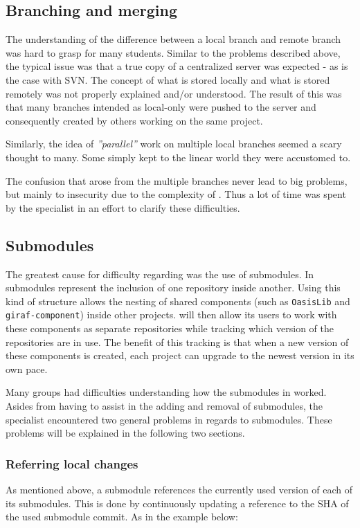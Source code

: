 \subsection{Branching and merging}
The understanding of the difference between a local branch and remote branch was hard to grasp for many students.
Similar to the problems described above, the typical issue was that a true copy of a centralized server was expected - as is the case with SVN.
The concept of what is stored locally and what is stored remotely was not properly explained and/or understood.
The result of this was that many branches intended as local-only were pushed to the server and consequently created by others working on the same project.

Similarly, the idea of \textit{''parallel''} work on multiple local branches seemed a scary thought to many.
Some simply kept to the linear world they were accustomed to.

The confusion that arose from the multiple branches never lead to big problems, but mainly to insecurity due to the complexity of \git{}.
Thus a lot of time was spent by the \git{} specialist in an effort to clarify these difficulties.

\subsection{Submodules}
The greatest cause for difficulty regarding \git{} was the use of submodules.
In \git{} submodules represent the inclusion of one repository inside another.
Using this kind of structure allows the nesting of shared components (such as \texttt{OasisLib} and \texttt{giraf-component}) inside other projects.
\Git{} will then allow its users to work with these components as separate repositories while tracking which version of the repositories are in use.
The benefit of this tracking is that when a new version of these components is created, each project can upgrade to the newest version in its own pace.

Many groups had difficulties understanding how the submodules in \git{} worked.
Asides from having to assist in the adding and removal of submodules, the \git{} specialist encountered two general problems in regards to \git{} submodules.
These problems will be explained in the following two sections.

\subsubsection{Referring local changes}\label{git:sub:sha}
As mentioned above, a \git{} submodule references the currently used version of each of its submodules.
This is done by continuously updating a reference to the SHA of the used submodule commit.
As in the example below:


